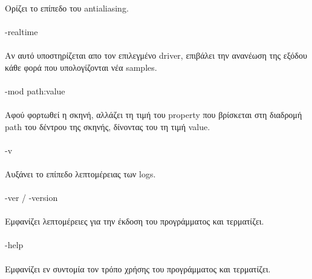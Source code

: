 \begin{sloppypar}
\paragraph{}
	Ορίζει το επίπεδο του antialiasing.

\paragraph{}
	-realtime
\paragraph{}
	Αν αυτό υποστηρίζεται απο τον επιλεγμένο driver, επιβάλει την ανανέωση της εξόδου κάθε φορά που υπολογίζονται νέα samples.

\paragraph{}
	-mod path:value
\paragraph{}
	Αφού φορτωθεί η σκηνή, αλλάζει τη τιμή του property που βρίσκεται στη διαδρομή path του δέντρου της σκηνής, δίνοντας του 
τη τιμή value.

\paragraph{}
	-v
\paragraph{}
	Αυξάνει το επίπεδο λεπτομέρειας των logs.

\paragraph{}
	-ver / -version
\paragraph{}
	Εμφανίζει λεπτομέρειες για την έκδοση του προγράμματος και τερματίζει.

\paragraph{}
	-help
\paragraph{}
	Εμφανίζει εν συντομία τον τρόπο χρήσης του προγράμματος και τερματίζει.


\end{sloppypar}
